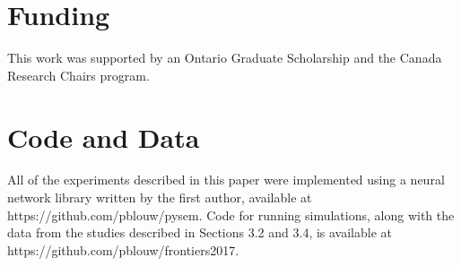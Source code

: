 \documentclass[utf8]{frontiersSCNS} %
\begin{document}
\section*{Funding}
This work was supported by an Ontario Graduate Scholarship and the Canada Research Chairs program. 

\section*{Code and Data}
All of the experiments described in this paper were implemented using a neural network library written by the first author, available at https://github.com/pblouw/pysem. Code for running simulations, along with the data from the studies described in Sections 3.2 and 3.4, is available at https://github.com/pblouw/frontiers2017. 

 

\end{document}
